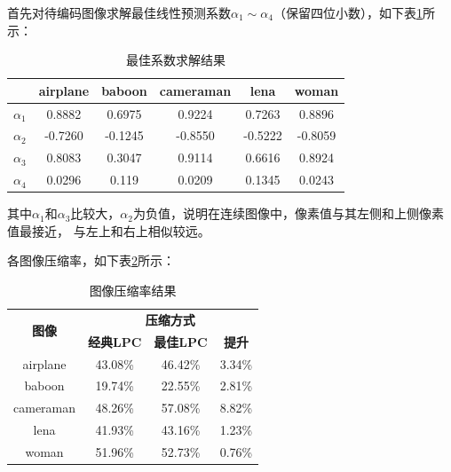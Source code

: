 \documentclass[12pt,a4paper]{article}%
\begin{document}
\vspace{-0.3em}
首先对待编码图像求解最佳线性预测系数$\alpha_1 \sim \alpha_4$（保留四位小数），如下表\ref{tab: the best weight}所示：
\begin{table}[htbp]
    \centering
    \vspace{-0.3em}
    \caption{最佳系数求解结果}
    \vspace{-0.4em}
    \begin{tabular}{c|ccccc}
        \toprule
                   & airplane & baboon  & cameraman & lena    & woman   \\
        \midrule
        $\alpha_1$ & 0.8882   & 0.6975  & 0.9224    & 0.7263  & 0.8896  \\
        $\alpha_2$ & -0.7260  & -0.1245 & -0.8550   & -0.5222 & -0.8059 \\
        $\alpha_3$ & 0.8083   & 0.3047  & 0.9114    & 0.6616  & 0.8924  \\
        $\alpha_4$ & 0.0296   & 0.119   & 0.0209    & 0.1345  & 0.0243  \\
        \bottomrule
    \end{tabular}%
    \label{tab: the best weight}
\end{table}%

其中$\alpha_1$和$\alpha_3$比较大，$\alpha_2$为负值，说明在连续图像中，像素值与其左侧和上侧像素值最接近，
与左上和右上相似较远。

各图像压缩率，如下表\ref{tab: compression rate}所示：
\begin{table}[htbp]
    \centering
    \caption{图像压缩率结果}
    \begin{tabular}{c|ccc}
        \toprule
        \multirow{2}[4]{*}{\textbf{图像}} & \multicolumn{3}{c}{\textbf{压缩方式}}                                                         \\
        \cmidrule{2-4}                    & \multicolumn{1}{c|}{\textbf{经典LPC}} & \multicolumn{1}{c|}{\textbf{最佳LPC}} & \textbf{提升} \\
        \midrule
        airplane                          & 43.08\%                               & 46.42\%                               & 3.34\%        \\
        baboon                            & 19.74\%                               & 22.55\%                               & 2.81\%        \\
        cameraman                         & 48.26\%                               & 57.08\%                               & 8.82\%        \\
        lena                              & 41.93\%                               & 43.16\%                               & 1.23\%        \\
        woman                             & 51.96\%                               & 52.73\%                               & 0.76\%        \\
        \bottomrule
    \end{tabular}%
    \label{tab: compression rate}
\end{table}%
\end{document}
